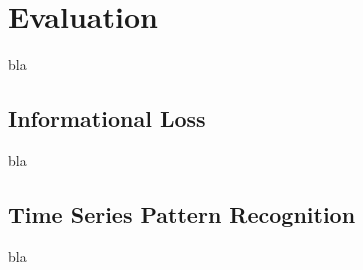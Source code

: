 \chapter{Evaluation}
bla
\section{Informational Loss}
bla

\section{Time Series Pattern Recognition}
bla









